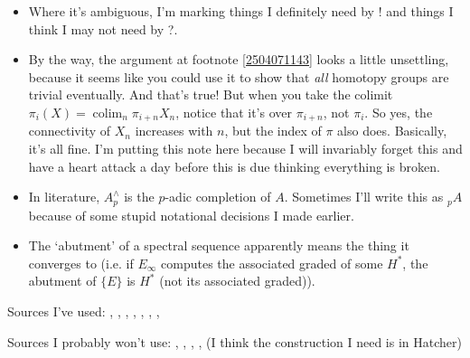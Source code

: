 \documentclass{MetricNotes2023}
\DeclareMathOperator{\colim}{colim}
\begin{document}
\begin{itemize}
\item Where it's ambiguous, I'm marking things I definitely need by ! and things I think I may not need by ?.

\item By the way, the argument at footnote \ref{2504071143} looks a little unsettling, because it seems like you could use it to show that \textit{all} homotopy groups are trivial eventually. And that's true! But when you take the colimit \(\pi_i(X)=\colim_n \pi_{i+n}X_n\), notice that it's over \(\pi_{i+n}\), not \(\pi_{i}\). So yes, the connectivity of \(X_n\) increases with \(n\), but the index of \(\pi\) also does. Basically, it's all fine. I'm putting this note here because I will invariably forget this and have a heart attack a day before this is due thinking everything is broken. 

\item In literature, \(A^\wedge_p\) is the \(p\)-adic completion of \(A\). Sometimes I'll write this as \(\text{}_pA\) because of some stupid notational decisions I made earlier.

\item The `abutment' of a spectral sequence apparently means the thing it converges to (i.e. if \(E_\infty\) computes the associated graded of some \(H^*\), the abutment of \(\{E\}\) is \(H^*\) (not its associated graded)). 
\end{itemize}

Sources I've used: \autocite{cobordism}, 
\autocite{ass}, \autocite{spectra}, \autocite{hatcher5}, \autocite{hatcher}, \autocite{rognes2}, \autocite{concise}, \autocite{spectral_sequences}

Sources I probably won't use: \autocite{suspension}, \autocite{stable_homotopy}, \autocite{foundations}, \autocite{primer}, \autocite{mazelgee} (I think the construction I need is in Hatcher)

\printbibliography
\end{document}
